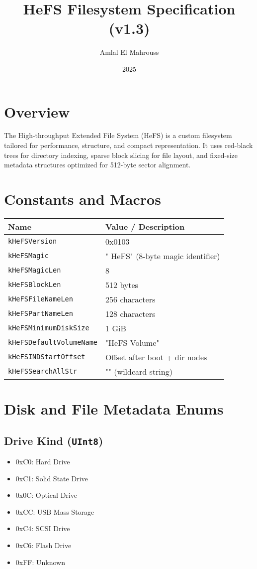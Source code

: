 \documentclass{article}
\title{HeFS Filesystem Specification (v1.3)}
\author{Amlal El Mahrouss}
\date{2025}
\begin{document}
\maketitle

\section{Overview}
The High-throughput Extended File System (HeFS) is a custom filesystem tailored for performance, structure, and compact representation. It uses red-black trees for directory indexing, sparse block slicing for file layout, and fixed-size metadata structures optimized for 512-byte sector alignment.

\section{Constants and Macros}
\begin{longtable}{|l|l|}
\hline
\textbf{Name} & \textbf{Value / Description} \\
\hline
\texttt{kHeFSVersion} & 0x0103 \\
\texttt{kHeFSMagic} & "  HeFS" (8-byte magic identifier) \\
\texttt{kHeFSMagicLen} & 8 \\
\texttt{kHeFSBlockLen} & 512 bytes \\
\texttt{kHeFSFileNameLen} & 256 characters \\
\texttt{kHeFSPartNameLen} & 128 characters \\
\texttt{kHeFSMinimumDiskSize} & 1 GiB \\
\texttt{kHeFSDefaultVolumeName} & "HeFS Volume" \\
\texttt{kHeFSINDStartOffset} & Offset after boot + dir nodes \\
\texttt{kHeFSSearchAllStr} & "\*" (wildcard string) \\
\hline
\end{longtable}

\section{Disk and File Metadata Enums}

\subsection{Drive Kind (\texttt{UInt8})}
\begin{itemize}
\item 0xC0: Hard Drive
\item 0xC1: Solid State Drive
\item 0x0C: Optical Drive
\item 0xCC: USB Mass Storage
\item 0xC4: SCSI Drive
\item 0xC6: Flash Drive
\item 0xFF: Unknown
\end{itemize}
\end{document}
